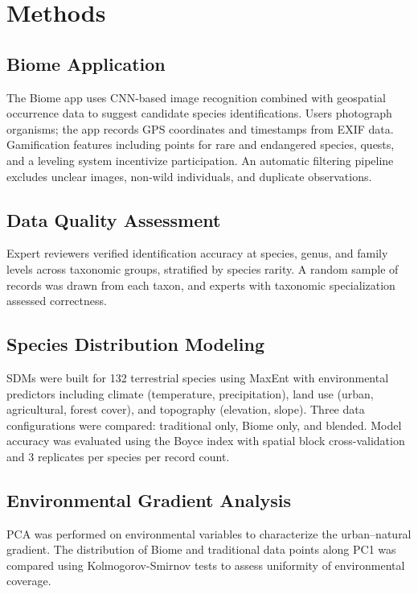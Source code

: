 \documentclass[11pt]{article}
\begin{document}
\section{Methods}

\subsection{Biome Application}

The Biome app uses CNN-based image recognition combined with geospatial occurrence data to suggest candidate species identifications. Users photograph organisms; the app records GPS coordinates and timestamps from EXIF data. Gamification features including points for rare and endangered species, quests, and a leveling system incentivize participation. An automatic filtering pipeline excludes unclear images, non-wild individuals, and duplicate observations.

\subsection{Data Quality Assessment}

Expert reviewers verified identification accuracy at species, genus, and family levels across taxonomic groups, stratified by species rarity. A random sample of records was drawn from each taxon, and experts with taxonomic specialization assessed correctness.

\subsection{Species Distribution Modeling}

SDMs were built for 132 terrestrial species using MaxEnt \citep{phillips2006maximum} with environmental predictors including climate (temperature, precipitation), land use (urban, agricultural, forest cover), and topography (elevation, slope). Three data configurations were compared: traditional only, Biome only, and blended. Model accuracy was evaluated using the Boyce index \citep{boyce2002evaluating} with spatial block cross-validation \citep{roberts2017cross} and 3 replicates per species per record count.

\subsection{Environmental Gradient Analysis}

PCA was performed on environmental variables to characterize the urban--natural gradient. The distribution of Biome and traditional data points along PC1 was compared using Kolmogorov-Smirnov tests to assess uniformity of environmental coverage.
\end{document}
